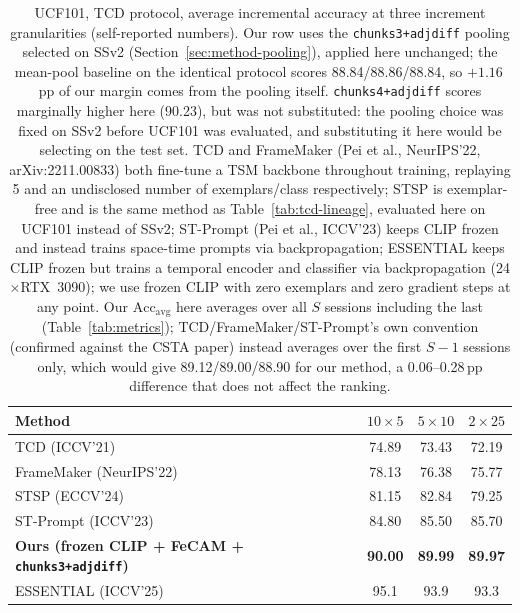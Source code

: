 \documentclass[11pt]{article}
\begin{document}
\begin{table}[h]
\centering
\caption{UCF101, TCD protocol, average incremental accuracy at three
increment granularities (self-reported numbers). Our row uses the
\texttt{chunks3+adjdiff} pooling selected on SSv2
(Section~\ref{sec:method-pooling}), applied here unchanged; the mean-pool
baseline on the identical protocol scores 88.84/88.86/88.84, so
$+1.16$\,pp of our margin comes from the pooling itself.
\texttt{chunks4+adjdiff} scores marginally higher here (90.23), but was
not substituted: the pooling choice was fixed on SSv2 before UCF101 was
evaluated, and substituting it here would be selecting on the test set.
TCD and FrameMaker (Pei
et al., NeurIPS'22, arXiv:2211.00833) both fine-tune a TSM backbone
throughout training, replaying 5 and an undisclosed number of
exemplars/class respectively; STSP is exemplar-free and is the same method
as Table~\ref{tab:tcd-lineage}, evaluated here on UCF101 instead of SSv2;
ST-Prompt (Pei et al., ICCV'23) keeps CLIP frozen and instead trains
space-time prompts via backpropagation; ESSENTIAL keeps CLIP frozen but
trains a temporal encoder and classifier via backpropagation
(24$\times$RTX~3090); we use frozen CLIP with zero exemplars and zero
gradient steps at any point. Our $\mathrm{Acc}_{\mathrm{avg}}$ here
averages over all $S$ sessions including the last (Table~\ref{tab:metrics});
TCD/FrameMaker/ST-Prompt's own convention (confirmed against the CSTA
paper) instead averages over the first $S{-}1$ sessions only, which would
give 89.12/89.00/88.90 for our method, a 0.06--0.28\,pp difference that
does not affect the ranking.}
\label{tab:ucf101-compare}
\small
\begin{tabular}{@{}lccc@{}}
\toprule
Method & $10\times5$ & $5\times10$ & $2\times25$ \\
\midrule
TCD (ICCV'21) & 74.89 & 73.43 & 72.19 \\
FrameMaker (NeurIPS'22) & 78.13 & 76.38 & 75.77 \\
STSP (ECCV'24) & 81.15 & 82.84 & 79.25 \\
ST-Prompt (ICCV'23) & 84.80 & 85.50 & 85.70 \\
\textbf{Ours (frozen CLIP + FeCAM + \texttt{chunks3+adjdiff})} & \textbf{90.00} & \textbf{89.99} & \textbf{89.97} \\
ESSENTIAL (ICCV'25) & 95.1 & 93.9 & 93.3 \\
\bottomrule
\end{tabular}
\end{table}
\end{document}
